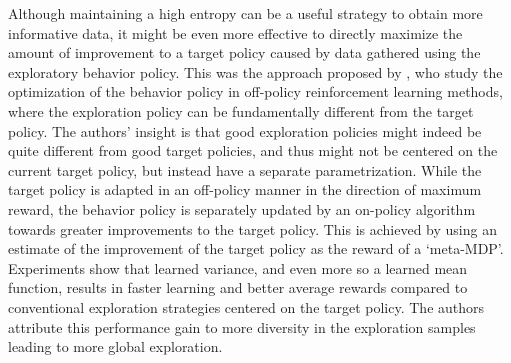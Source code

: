 Although maintaining a high entropy can be a useful strategy to obtain more informative data, it might be even more effective to directly maximize the amount of improvement to a target policy caused by data gathered using the exploratory behavior policy. This was the approach proposed by , who study the optimization of the behavior policy in off-policy reinforcement learning methods, where the exploration policy can be fundamentally different from the target policy. The authors' insight is that good exploration policies might indeed be quite different from good target policies, and thus might not be centered on the current target policy, but instead have a separate parametrization. While the target policy is adapted in an off-policy manner in the direction of maximum reward, the behavior policy is separately updated by an on-policy algorithm towards greater improvements to the target policy. This is achieved by using an estimate of the improvement of the target policy as the reward of a `meta-MDP'. Experiments show that learned variance, and even more so a learned mean function, results in faster learning and better average rewards compared to conventional exploration strategies centered on the target policy. The authors attribute this performance gain to more diversity in the exploration samples leading to more global exploration.

